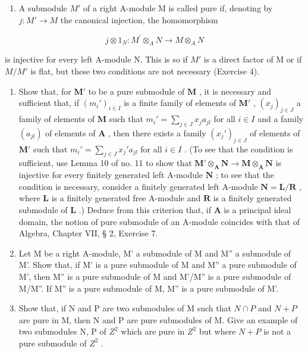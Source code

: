 \begin{enumerate}
\def\labelenumi{\arabic{enumi}.}
\setcounter{enumi}{23}
\tightlist
\item
  A submodule \(M'\) of a right A-module M is called pure if, denoting by \(j: M' \rightarrow M\) the canonical injection, the homomorphism
\end{enumerate}

\[
j \otimes 1 _ {N} \colon M ^ {\prime} \otimes_ {A} N \rightarrow M \otimes_ {A} N
\]

is injective for every left A-module N. This is so if \(M'\) is a direct factor of M or if \(M/M'\) is flat, but these two conditions are not necessary (Exercise 4).

\begin{enumerate}
\def\labelenumi{(\alph{enumi})}
\item
  Show that, for \(\mathbf{M}'\) to be a pure submodule of \(\mathbf{M}\) , it is necessary and sufficient that, if \((m_i')_{i\in I}\) is a finite family of elements of \(\mathbf{M}'\) , \((x_j)_{j\in J}\) a family of elements of \(\mathbf{M}\) such that \(m_i' = \sum_{j\in J} x_j a_{jl}\) for all \(i\in I\) and a family \((a_{jl})\) of elements of \(\mathbf{A}\) , then there exists a family \((x_j')_{j\in J}\) of elements of \(\mathbf{M}'\) such that \(m_i' = \sum_{j\in J} x_j' a_{jl}\) for all \(i\in I\) . (To see that the condition is sufficient, use Lemma 10 of no. 11 to show that \(\mathbf{M}' \otimes_{\mathbf{A}} \mathbf{N} \to \mathbf{M} \otimes_{\mathbf{A}} \mathbf{N}\) is injective for every finitely generated left A-module \(\mathbf{N}\) ; to see that the condition is necessary, consider a finitely generated left A-module \(\mathbf{N} = \mathbf{L}/\mathbf{R}\) , where \(\mathbf{L}\) is a finitely generated free A-module and \(\mathbf{R}\) is a finitely generated submodule of \(\mathbf{L}\) .) Deduce from this criterion that, if \(\mathbf{A}\) is a principal ideal domain, the notion of pure submodule of an A-module coincides with that of Algebra, Chapter VII, § 2, Exercise 7.
\item
  Let M be a right A-module, M' a submodule of M and M'' a submodule of M'. Show that, if M' is a pure submodule of M and M'' a pure submodule of M', then M'' is a pure submodule of M and M'/M'' is a pure submodule of M/M''. If M'' is a pure submodule of M, M'' is a pure submodule of M'.
\item
  Show that, if N and P are two submodules of M such that \(N \cap P\) and \(N + P\) are pure in M, then N and P are pure submodules of M. Give an example of two submodules N, P of \(Z^{2}\) which are pure in \(Z^{2}\) but where \(N + P\) is not a pure submodule of \(Z^{2}\) .

\end{enumerate}
